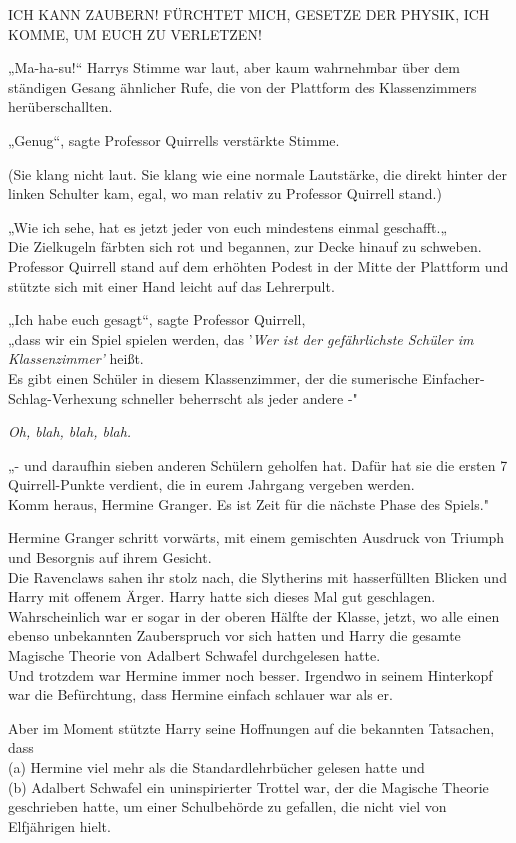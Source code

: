 {ICH KANN ZAUBERN! FÜRCHTET MICH, GESETZE DER PHYSIK, ICH KOMME, UM EUCH ZU VERLETZEN!

„Ma-ha-su!“ Harrys Stimme war laut, aber kaum wahrnehmbar über dem ständigen Gesang ähnlicher Rufe, die von der Plattform des Klassenzimmers herüberschallten.

„Genug“, sagte Professor Quirrells verstärkte Stimme.

(Sie klang nicht laut. Sie klang wie eine normale Lautstärke, die direkt hinter der linken Schulter kam, egal, wo man relativ zu Professor Quirrell stand.)

„Wie ich sehe, hat es jetzt jeder von euch mindestens einmal geschafft.„\\ Die Zielkugeln färbten sich rot und begannen, zur Decke hinauf zu schweben.\\ Professor Quirrell stand auf dem erhöhten Podest in der Mitte der Plattform und stützte sich mit einer Hand leicht auf das Lehrerpult.

„Ich habe euch gesagt“, sagte Professor Quirrell,\\ „dass wir ein Spiel spielen werden, das '\emph{Wer ist der gefährlichste Schüler im Klassenzimmer'} heißt.\\ Es gibt einen Schüler in diesem Klassenzimmer, der die sumerische Einfacher-Schlag-Verhexung schneller beherrscht als jeder andere -"

\emph{Oh, blah, blah, blah.}

„- und daraufhin sieben anderen Schülern geholfen hat. Dafür hat sie die ersten 7 Quirrell-Punkte verdient, die in eurem Jahrgang vergeben werden.\\ Komm heraus, Hermine Granger. Es ist Zeit für die nächste Phase des Spiels."

Hermine Granger schritt vorwärts, mit einem gemischten Ausdruck von Triumph und Besorgnis auf ihrem Gesicht.\\ Die Ravenclaws sahen ihr stolz nach, die Slytherins mit hasserfüllten Blicken und Harry mit offenem Ärger. Harry hatte sich dieses Mal gut geschlagen.\\ Wahrscheinlich war er sogar in der oberen Hälfte der Klasse, jetzt, wo alle einen ebenso unbekannten Zauberspruch vor sich hatten und Harry die gesamte Magische Theorie von Adalbert Schwafel durchgelesen hatte.\\ Und trotzdem war Hermine immer noch besser. Irgendwo in seinem Hinterkopf war die Befürchtung, dass Hermine einfach schlauer war als er.

Aber im Moment stützte Harry seine Hoffnungen auf die bekannten Tatsachen, dass\\ (a) Hermine viel mehr als die Standardlehrbücher gelesen hatte und\\ (b) Adalbert Schwafel ein uninspirierter Trottel war, der die Magische Theorie geschrieben hatte, um einer Schulbehörde zu gefallen, die nicht viel von Elfjährigen hielt.

}
